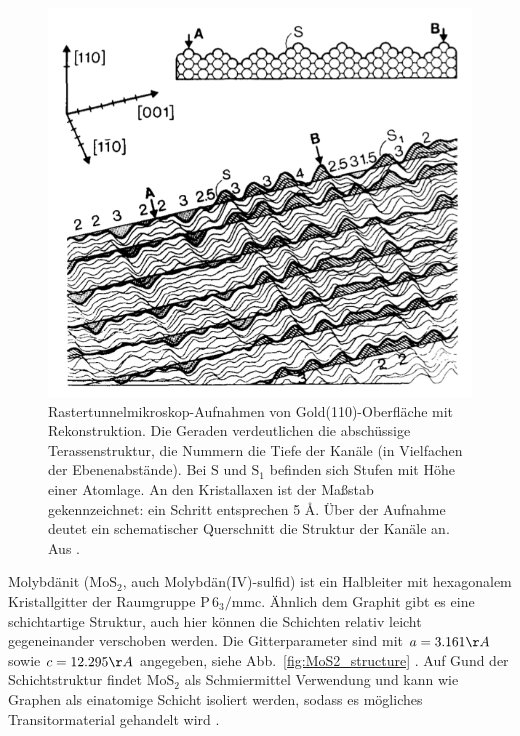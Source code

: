 \begin{figure}
    \includegraphics[width=1.0\textwidth]{pics/Au(110)_channels}
    \caption{Rastertunnelmikroskop-Aufnahmen von Gold(110)-Oberfläche mit 
Rekonstruktion. Die Geraden verdeutlichen die abschüssige Terassenstruktur, die 
Nummern die Tiefe der Kanäle (in Vielfachen der Ebenenabstände). Bei $\mathrm{S}$
und $\mathrm{S_1}$ befinden sich Stufen mit Höhe einer Atomlage. An den Kristallaxen 
ist der Maßstab gekennzeichnet: ein Schritt entsprechen 5 \AA. Über der Aufnahme 
deutet ein schematischer Querschnitt die Struktur der Kanäle an. 
Aus \cite{binnig1983111}.}
    \label{fig:Ag(100)}
\end{figure} 

Molybdänit ($\mathrm{MoS_2}$, auch Molybdän(IV)-sulfid) ist ein Halbleiter mit 
hexagonalem Kristallgitter der Raumgruppe $\mathrm{P \, 6_3/mmc}$. Ähnlich 
dem Graphit gibt es eine schichtartige Struktur, auch hier können die Schichten 
relativ leicht gegeneinander verschoben werden. Die Gitterparameter sind mit 
$a = 3.161 \AA$ sowie $c = 12.295 \AA$ angegeben, siehe
Abb.~\ref{fig:MoS2_structure} \cite{schrocke1981mineralogie}. 
Auf Gund der Schichtstruktur findet $\mathrm{MoS_2}$ als 
Schmiermittel Verwendung und kann wie Graphen als einatomige Schicht isoliert 
werden, sodass es mögliches Transitormaterial gehandelt wird 
\cite{mak2010atomically}. 

